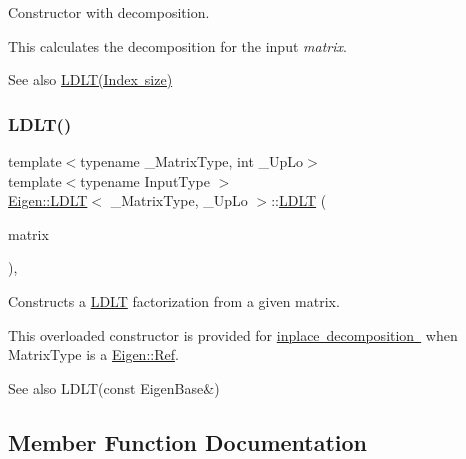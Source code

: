Constructor with decomposition. 

This calculates the decomposition for the input {\itshape matrix}.

\begin{DoxySeeAlso}{See also}
\mbox{\hyperlink{class_eigen_1_1_l_d_l_t_a154aa41bd2460199d48861eaf5e4f597}{L\+D\+L\+T(\+Index size)}} 
\end{DoxySeeAlso}
\mbox{\label{class_eigen_1_1_l_d_l_t_adf853d6cbbc49f3535a44439bca344d9}} 
\subsubsection{\texorpdfstring{LDLT()}{LDLT()}\hspace{0.1cm}{\footnotesize\ttfamily [4/4]}}
{\footnotesize\ttfamily template$<$typename \+\_\+\+Matrix\+Type, int \+\_\+\+Up\+Lo$>$ \\
template$<$typename Input\+Type $>$ \\
\mbox{\hyperlink{class_eigen_1_1_l_d_l_t}{Eigen\+::\+L\+D\+LT}}$<$ \+\_\+\+Matrix\+Type, \+\_\+\+Up\+Lo $>$\+::\mbox{\hyperlink{class_eigen_1_1_l_d_l_t}{L\+D\+LT}} (\begin{DoxyParamCaption}\item[{\mbox{\hyperlink{struct_eigen_1_1_eigen_base}{Eigen\+Base}}$<$ Input\+Type $>$ \&}]{matrix }\end{DoxyParamCaption})\hspace{0.3cm}{\ttfamily [inline]}, {\ttfamily [explicit]}}



Constructs a \mbox{\hyperlink{class_eigen_1_1_l_d_l_t}{L\+D\+LT}} factorization from a given matrix. 

This overloaded constructor is provided for \mbox{\hyperlink{}{inplace decomposition }} when {\ttfamily Matrix\+Type} is a \mbox{\hyperlink{class_eigen_1_1_ref}{Eigen\+::\+Ref}}.

\begin{DoxySeeAlso}{See also}
L\+D\+L\+T(const Eigen\+Base\&) 
\end{DoxySeeAlso}


\subsection{Member Function Documentation}
\mbox{\label{class_eigen_1_1_l_d_l_t_ac656a209860fa0c6a8faa8bb9f9a06ef}} 
